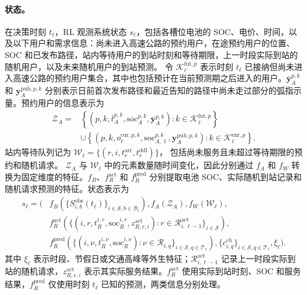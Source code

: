 \documentclass[12pt,a4paper,UTF8]{ctexart}
\begin{document}
\paragraph{状态。}
在决策时刻 $t_\ell$，RL 观测系统状态 $s_\ell$，包括各槽位电池的 SOC、电价、时间，以及以下用户和需求信息：尚未进入高速公路的预约用户，在途预约用户的位置、SOC 和已发布路径，站内等待用户的到站时刻和等待期限，上一时段实际到站的随机用户，以及未来随机用户的到站预测。
令 $\mathcal K_\ell^{\mathrm{fut},p}$ 表示时刻 $t_\ell$ 已接纳但尚未进入高速公路的预约用户集合，其中也包括预计在当前预测期之后进入的用户。$\bar{\mathbf y}_A^{p,k}$ 和 $\mathbf y_A^{\mathrm{pub},p,k}$ 分别表示日前首次发布路径和最近告知的路径中尚未走过部分的弧指示量。预约用户的信息表示为
\begin{equation}
\begin{aligned}
\mathcal Z_{A}
={}&
\left\{
\left(p,k,\bar t_A^{p,k},
\overline{\mathrm{soc}}_A^{p,k},
\bar{\mathbf y}_A^{p,k}\right):
k\in\mathcal K_\ell^{\mathrm{fut},p}
\right\}\\
&\cup
\left\{
\left(p,k,o_\ell^{\mathrm{cur},p,k},\mathrm{soc}_{A,\ell}^{p,k},
\mathbf y_A^{\mathrm{pub},p,k}\right):
k\in\mathcal K_\ell^{\mathrm{enr},p}
\right\}.
\end{aligned}
\label{eq:rl_reservation_information}
\end{equation}
站内等待队列记为
$\mathcal W_\ell=\{(r,i,t_r^{\mathrm{arr}},t_r^{\mathrm{ddl}})\}$，
包括尚未服务且未超过等待期限的预约和随机请求。
$\mathcal Z_{A}$ 与 $\mathcal W_\ell$ 中的元素数量随时间变化，因此分别通过 $f_A$ 和 $f_W$ 转换为固定维度的特征。$f_B$、$f_R^{\mathrm{act}}$ 和 $f_R^{\mathrm{pred}}$ 分别提取电池 SOC、实际随机到站记录和随机请求预测的特征。状态表示为
\begin{equation}
\begin{aligned}
s_\ell=\Big(&
f_B\!\left(\{S_{i,b}^{\mathrm{obs}}(t_\ell)\}_{i\in\mathcal S,b\in\mathcal B_i}\right),
f_A(\mathcal Z_{A}),
f_W(\mathcal W_\ell),\\
&
f_R^{\mathrm{act}}\!\left(
\{(i,r,t_R^{i,r},\mathrm{soc}_R^{i,r},z_{R,r,i}^{\mathrm{act}}):
r\in\mathcal R_{i,\ell-1}^{\mathrm{act}}\}_{i\in\mathcal S}
\right),\\
&
f_R^{\mathrm{pred}}\!\left(
\{(i,\nu,t_{R}^{i,\nu},\mathrm{soc}_{R}^{i,\nu}):
\nu\in\mathcal R_{i,q}\}_{i\in\mathcal S,q\in\mathcal T_\ell}
\right),
\{c^{ch}_{i,q}\}_{i\in\mathcal S,q\in\mathcal T_\ell},
\xi_\ell
\Big).
\end{aligned}
\label{eq:rl_state}
\end{equation}
其中 $\xi_\ell$ 表示时段、节假日或交通高峰等外生特征；$\mathcal R_{i,\ell-1}^{\mathrm{act}}$ 记录上一时段实际到站的随机请求，$z_{R,r,i}^{\mathrm{act}}$ 表示其实际服务结果。$f_R^{\mathrm{act}}$ 使用实际到站时刻、SOC 和服务结果，$f_R^{\mathrm{pred}}$ 仅使用时刻 $t_\ell$ 已知的预测，两类信息分别处理。
\end{document}
